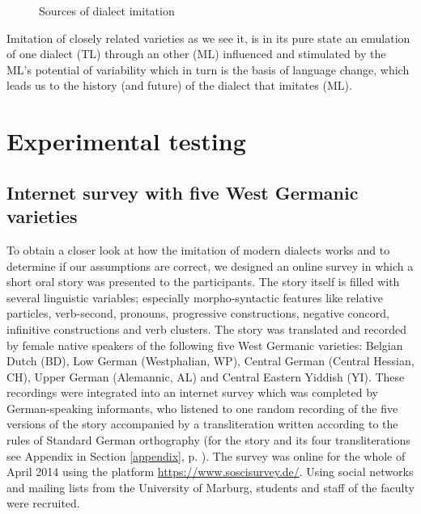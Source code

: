 \documentclass[output=paper]{LSP/langsci}
\begin{document}
\begin{figure}[htbp]
 \begin{center}
              \caption{Sources of dialect imitation}\label{imitationalssubtraktiveFarbmischung}	%
\end{center}
 \end{figure}
\FloatBarrier

 
Imitation of closely related varieties as we see it, is in its pure state an emulation of one dialect (TL) through an other (ML) influenced and stimulated by the ML's potential of variability which in turn is the basis of language change, which leads us to the history (and future) of the dialect that imitates (ML).

 \section{Experimental testing}\label{experiment}
 
 
 \subsection{Internet survey with five West Germanic varieties }\label{online}

To obtain a closer look at how the imitation of modern dialects works and to determine if our assumptions are correct, we designed an online survey in which a short oral story was presented to the participants. The story itself is filled with several linguistic variables; especially morpho-syntactic features like relative particles, verb-second, pronouns, progressive constructions, negative concord, infinitive constructions and verb clusters. The story was translated and recorded by female native speakers of the following five West Germanic varieties: Belgian Dutch (BD), Low German (Westphalian, WP), Central German (Central Hessian, CH), Upper German (Alemannic, AL) and Central Eastern Yiddish (YI). These recordings were integrated into an internet survey which was completed by German-speaking informants, who listened to one random recording of the five versions of the story accompanied by a transliteration written according to the rules of Standard German orthography (for the story and its four transliterations see Appendix in Section \ref{appendix}, p. \pageref{appendix}). The survey was online for the whole of April 2014 using the platform \url{https://www.soscisurvey.de/}. Using social networks and mailing lists from the University of Marburg, students and staff of the faculty were recruited.
\end{document}
